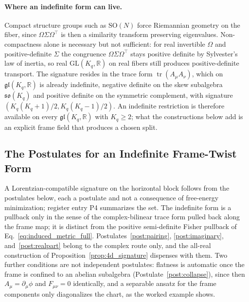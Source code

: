 \documentclass[11pt]{article}
\begin{document}
\paragraph{Where an indefinite form can live.} Compact structure groups such as $\mathrm{SO}(N)$ force Riemannian geometry on the fiber, since $\Omega\Sigma\Omega^\top$ is then a similarity transform preserving eigenvalues. Non-compactness alone is necessary but not sufficient: for real invertible $\Omega$ and positive-definite $\Sigma$ the congruence $\Omega\Sigma\Omega^\top$ stays positive definite by Sylvester's law of inertia, so real $\mathrm{GL}(K_q,\mathbb{R})$ on real fibers still produces positive-definite transport. The signature resides in the trace form $\operatorname{tr}(A_\mu A_\nu)$, which on $\mathfrak{gl}(K_q,\mathbb{R})$ is already indefinite, negative definite on the skew subalgebra $\mathfrak{so}(K_q)$ and positive definite on the symmetric complement, with signature $(K_q(K_q+1)/2, K_q(K_q-1)/2)$. An indefinite restriction is therefore available on every $\mathfrak{gl}(K_q,\mathbb{R})$ with $K_q \ge 2$; what the constructions below add is an explicit frame field that produces a chosen split.

\subsection{The Postulates for an Indefinite Frame-Twist Form}

A Lorentzian-compatible signature on the horizontal block follows from the postulates below, each a postulate and not a consequence of free-energy minimization; register entry P4 summarizes the set. The indefinite form is a pullback only in the sense of the complex-bilinear trace form pulled back along the frame map; it is distinct from the positive semi-definite Fisher pullback of Eq.~\eqref{eq:induced_metric_full}. Postulates~\ref{post:pairing}, \ref{post:imaginary}, and~\ref{post:realpart} belong to the complex route only, and the all-real construction of Proposition~\ref{prop:4d_signature} dispenses with them. Two further conditions are not independent postulates: flatness is automatic once the frame is confined to an abelian subalgebra (Postulate~\ref{post:collapse}), since then $A_\mu = \partial_\mu\phi$ and $F_{\mu\nu} = 0$ identically, and a separable ansatz for the frame components only diagonalizes the chart, as the worked example shows.
\end{document}
